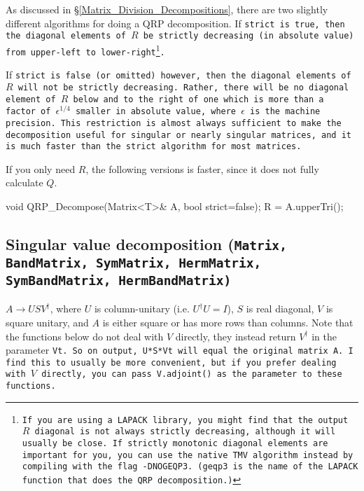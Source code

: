 As discussed in \S\ref{Matrix_Division_Decompositions}, 
there are two slightly different algorithms for doing a QRP decomposition.  
If \tt{strict} is \tt{true}, then the diagonal elements
of $R$ be strictly decreasing (in absolute value) from upper-left to lower-right\footnote{
If you are using a LAPACK library, you might find that the output $R$ diagonal
is not always strictly decreasing, although it will usually be close.  If strictly monotonic
diagonal elements are important for you, you can use the native TMV algorithm instead
by compiling with the flag \texttt{-DNOGEQP3}. (geqp3 is the name of the LAPACK 
function that does the QRP decomposition.)}.

If \tt{strict} is \tt{false} (or omitted) however, then the diagonal elements of $R$ will not
be strictly decreasing.  Rather, there will be no diagonal element
of $R$ below and to the right of one which is more than a factor of $\epsilon^{1/4}$ 
smaller in absolute value, where 
$\epsilon$ is the machine precision.  This restriction
is almost always sufficient to make the decomposition useful for singular or nearly
singular matrices, and it is much faster than the strict algorithm for most matrices.

If you only need $R$, the following versions is faster, since it does
not fully calculate $Q$.
\begin{tmvcode}
void QRP_Decompose(Matrix<T>& A, bool strict=false);
R = A.upperTri();
\end{tmvcode}

\subsection[Singular value decomposition] {Singular value decomposition \rm (\tt{Matrix}, \tt{BandMatrix}, \tt{SymMatrix}, \tt{HermMatrix},\\ \tt{SymBandMatrix}, \tt{HermBandMatrix})}

$A \rightarrow U S V^\dagger$,
where $U$ is column-unitary (i.e. $U^\dagger U = I$),
$S$ is real diagonal, $V$ is square unitary, and $A$ is either square or 
has more rows than columns.
Note that the functions below do not deal with $V$ directly, they instead return $V^\dagger$
in the parameter \tt{Vt}.  So on output, \tt{U*S*Vt} will equal the original matrix \tt{A}.  I find this to usually be more convenient, but if you prefer dealing with $V$ directly, you can pass
\tt{V.adjoint()} as the parameter to these functions.

